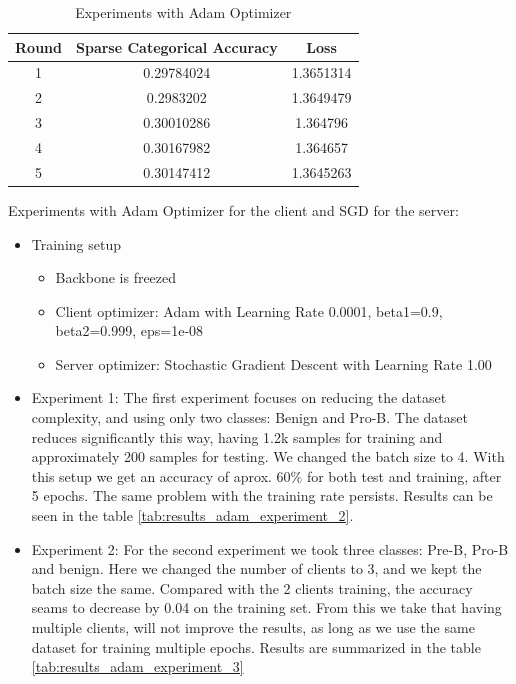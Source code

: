 \documentclass[runningheads,a4paper,11pt]{report}
\begin{document}
\begin{table}[htb]
\centering
\begin{tabular}{|c|c|c|}
\hline
\textbf{Round} & \textbf{Sparse Categorical Accuracy} & \textbf{Loss} \\
\hline
1 & 0.29784024 & 1.3651314 \\
\hline
2 & 0.2983202 & 1.3649479 \\
\hline
3 & 0.30010286 & 1.364796 \\
\hline
4 & 0.30167982 & 1.364657 \\
\hline
5 & 0.30147412 & 1.3645263 \\
\hline
\end{tabular}
\caption{Experiments with Adam Optimizer}
\label{tab:results_adam}
\end{table}

Experiments with Adam Optimizer for the client and SGD for the server:
\begin{itemize}
\item Training setup
\begin{itemize}
    \item Backbone is freezed 
    \item Client optimizer: Adam with Learning Rate 0.0001, beta1=0.9, beta2=0.999, eps=1e-08
    \item Server optimizer: Stochastic Gradient Descent with Learning Rate 1.00
\end{itemize}
\item Experiment 1: The first experiment focuses on reducing the dataset complexity, and using only two classes: Benign and Pro-B. The dataset reduces significantly this way, having 1.2k samples for training and approximately 200 samples for testing. We changed the batch size to 4. With this setup we get an accuracy of aprox. 60\% for both test and training, after 5 epochs. The same problem with the training rate persists. Results can be seen in the table \ref{tab:results_adam_experiment_2}.
\item Experiment 2: For the second experiment we took three classes: Pre-B, Pro-B and benign. Here we changed the number of clients to 3, and we kept the batch size the same. Compared with the 2 clients training, the accuracy seams to decrease by 0.04 on the training set. From this we take that having multiple clients, will not improve the results, as long as we use the same dataset for training multiple epochs. Results are summarized in the table \ref{tab:results_adam_experiment_3}
\end{itemize}
\end{document}
